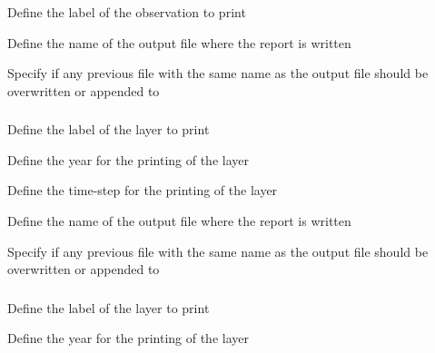  {Define the label of the observation to print}

 {Define the name of the output file where the report is written}

 {Specify if any previous file with the same name as the output file should be overwritten or appended to}

\subsubsection[Print a layer]{}

 {Define the label of the layer to print}

 {Define the year for the printing of the layer}

 {Define the time-step for the printing of the layer}

 {Define the name of the output file where the report is written}

 {Specify if any previous file with the same name as the output file should be overwritten or appended to}

\subsubsection[Print a derived view via a categorical layer]{}

 {Define the label of the layer to print}

 {Define the year for the printing of the layer}

